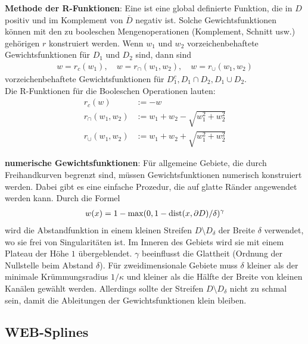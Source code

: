 \linie

\textbf{Methode der R-Funktionen}:
Eine  ist eine global definierte Funktion,
die in $D$ positiv und im Komplement von $\overline{D}$ negativ ist.
Solche Gewichtsfunktionen können mit den zu booleschen Mengenoperationen (Komplement, Schnitt usw.)
gehörigen  $r$ konstruiert werden.
Wenn $w_1$ und $w_2$ vorzeichenbehaftete Gewichtsfunktionen für $D_1$ und $D_2$ sind, dann sind
\begin{align*}
    w = r_c(w_1),\quad
    w = r_\cap(w_1, w_2),\quad
    w = r_\cup(w_1, w_2)
\end{align*}
vorzeichenbehaftete Gewichtsfunktionen für $D_1^c, D_1 \cap D_2, D_1 \cup D_2$.\\
Die R-Funktionen für die Booleschen Operationen lauten:
\begin{align*}
    r_c(w) &:= -w\\
    r_\cap(w_1, w_2) &:= w_1 + w_2 - \sqrt{w_1^2 + w_2^2}\\
    r_\cup(w_1, w_2) &:= w_1 + w_2 + \sqrt{w_1^2 + w_2^2}
\end{align*}

\linie

\textbf{numerische Gewichtsfunktionen}:
Für allgemeine Gebiete, die durch Freihandkurven begrenzt sind,
müssen Gewichtsfunktionen numerisch konstruiert werden.
Dabei gibt es eine einfache Prozedur, die auf glatte Ränder angewendet werden kann.
Durch die Formel
\begin{align*}
    w(x) = 1 - \max(0, 1 - \operatorname{dist}(x, \partial D)/\delta)^\gamma
\end{align*}
wird die Abstandfunktion in einem kleinen Streifen $D \setminus D_\delta$ der Breite $\delta$
verwendet, wo sie frei von Singularitäten ist.
Im Inneren des Gebiets wird sie mit einem Plateau der Höhe $1$ übergeblendet.
$\gamma$ beeinflusst die Glattheit (Ordnung der Nullstelle beim Abstand $\delta$).
Für zweidimensionale Gebiete muss $\delta$ kleiner als der minimale Krümmungsradius $1/\kappa$
und kleiner als die Hälfte der Breite von kleinen Kanälen gewählt werden.
Allerdings sollte der Streifen $D \setminus D_\delta$ nicht zu schmal sein,
damit die Ableitungen der Gewichtsfunktionen klein bleiben.

\pagebreak

\subsection{%
    WEB-Splines%
}

